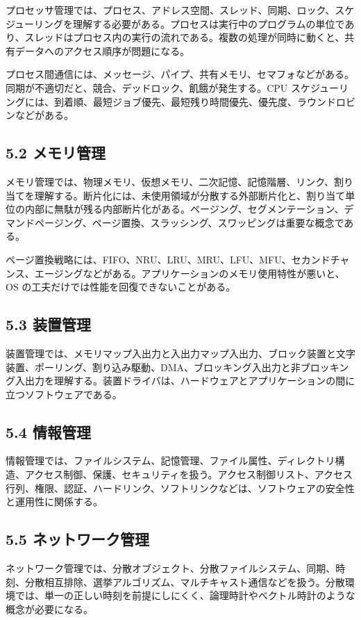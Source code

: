 \documentclass[a4paper,11pt]{ltjsarticle}
\begin{document}
プロセッサ管理では、プロセス、アドレス空間、スレッド、同期、ロック、スケジューリングを理解する必要がある。プロセスは実行中のプログラムの単位であり、スレッドはプロセス内の実行の流れである。複数の処理が同時に動くと、共有データへのアクセス順序が問題になる。

プロセス間通信には、メッセージ、パイプ、共有メモリ、セマフォなどがある。同期が不適切だと、競合、デッドロック、飢餓が発生する。CPU スケジューリングには、到着順、最短ジョブ優先、最短残り時間優先、優先度、ラウンドロビンなどがある。

\subsection{5.2 メモリ管理}

メモリ管理では、物理メモリ、仮想メモリ、二次記憶、記憶階層、リンク、割り当てを理解する。断片化には、未使用領域が分散する外部断片化と、割り当て単位の内部に無駄が残る内部断片化がある。ページング、セグメンテーション、デマンドページング、ページ置換、スラッシング、スワッピングは重要な概念である。

ページ置換戦略には、FIFO、NRU、LRU、MRU、LFU、MFU、セカンドチャンス、エージングなどがある。アプリケーションのメモリ使用特性が悪いと、OS の工夫だけでは性能を回復できないことがある。

\subsection{5.3 装置管理}

装置管理では、メモリマップ入出力と入出力マップ入出力、ブロック装置と文字装置、ポーリング、割り込み駆動、DMA、ブロッキング入出力と非ブロッキング入出力を理解する。装置ドライバは、ハードウェアとアプリケーションの間に立つソフトウェアである。

\subsection{5.4 情報管理}

情報管理では、ファイルシステム、記憶管理、ファイル属性、ディレクトリ構造、アクセス制御、保護、セキュリティを扱う。アクセス制御リスト、アクセス行列、権限、認証、ハードリンク、ソフトリンクなどは、ソフトウェアの安全性と運用性に関係する。

\subsection{5.5 ネットワーク管理}

ネットワーク管理では、分散オブジェクト、分散ファイルシステム、同期、時刻、分散相互排除、選挙アルゴリズム、マルチキャスト通信などを扱う。分散環境では、単一の正しい時刻を前提にしにくく、論理時計やベクトル時計のような概念が必要になる。
\end{document}
